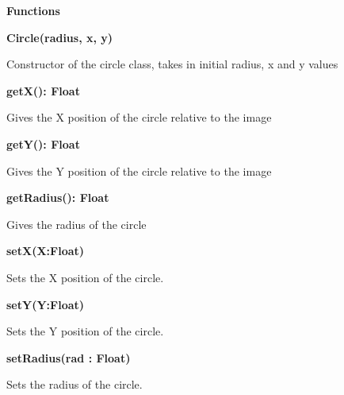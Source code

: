 \documentclass [10pt]{article}
\begin{document}
\textbf{Functions}

\textbf{Circle(radius, x, y)}

Constructor of the circle class, takes in initial radius, x and y values

\textbf{getX(): Float}

Gives the X position of the circle relative to the image

\textbf{getY(): Float}

Gives the Y position of the circle relative to the image

\textbf{getRadius(): Float}

Gives the radius of the circle

\textbf{setX(X:Float)}

Sets the X position of the circle.

\textbf{setY(Y:Float)}

Sets the Y position of the circle.

\textbf{setRadius(rad : Float)}

Sets the radius of the circle.
\end{document}
